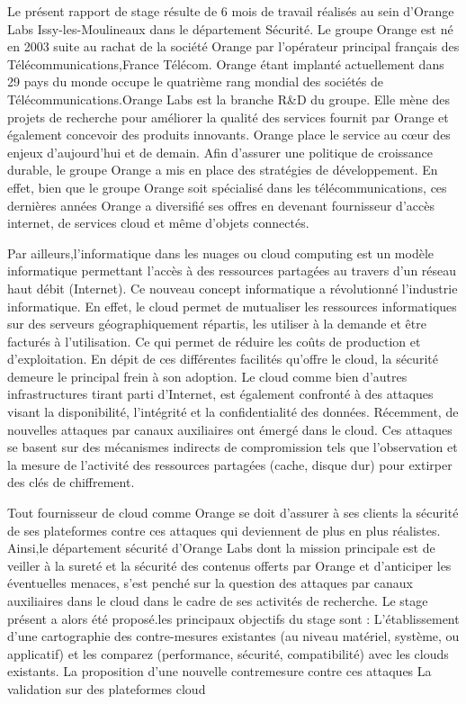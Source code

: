 Le présent rapport de stage résulte de 6 mois de travail réalisés au sein d'Orange Labs Issy-les-Moulineaux dans le département  Sécurité. Le groupe Orange est né en 2003 suite au  rachat de la société Orange par l'opérateur principal français des Télécommunications,France Télécom. Orange étant implanté actuellement dans 29 pays du monde occupe le quatrième rang mondial des sociétés de Télécommunications.Orange Labs est la branche R&D du groupe. Elle mène des projets de recherche pour améliorer la qualité des services fournit par Orange et également concevoir des produits innovants. Orange place le service au cœur des enjeux d'aujourd'hui et de demain.
Afin  d'assurer une politique de croissance durable, le groupe Orange a mis en place des stratégies de développement. En effet, bien que le groupe Orange soit spécialisé dans les télécommunications, ces dernières années Orange a diversifié ses offres en devenant fournisseur d'accès internet, de services cloud et même d'objets connectés. 
\par 
Par ailleurs,l'informatique dans les nuages ou cloud computing est un modèle  informatique permettant  l'accès à des ressources partagées au travers d'un réseau haut débit (Internet). Ce nouveau concept informatique a révolutionné l'industrie informatique.  En effet, le cloud permet de  mutualiser les ressources informatiques sur des serveurs géographiquement répartis, les utiliser à la demande et être facturés à l'utilisation. Ce qui permet de réduire les coûts de production et d'exploitation. En dépit de ces différentes facilités qu'offre le  cloud, la sécurité demeure  le principal  frein  à son  adoption.  Le cloud comme bien d'autres infrastructures tirant parti d'Internet, est également confronté à des attaques visant la disponibilité, l'intégrité et la confidentialité des données. Récemment, de nouvelles attaques  par  canaux auxiliaires  ont émergé dans le cloud. Ces attaques se basent sur des mécanismes indirects de compromission  tels que l'observation  et la mesure de l'activité des ressources partagées (cache, disque dur)  pour extirper des clés de chiffrement. 
\par 
Tout fournisseur de cloud comme Orange se doit d'assurer à ses clients la sécurité de ses plateformes contre ces attaques qui deviennent de plus en plus réalistes.
Ainsi,le département sécurité d'Orange Labs dont la mission  principale est  de veiller à la sureté et la sécurité des contenus offerts par Orange et d'anticiper les éventuelles menaces, s'est penché sur la question des attaques par canaux auxiliaires dans le cloud dans le cadre de ses activités de recherche. Le stage présent a alors été proposé.les principaux objectifs du stage sont :
L'établissement d'une cartographie des contre-mesures existantes (au niveau matériel, système, ou applicatif) et les comparez (performance, sécurité, compatibilité) avec les clouds existants.
La proposition d'une nouvelle contremesure contre ces attaques
La validation sur des plateformes cloud


